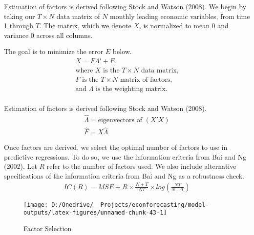 \documentclass[11pt, letterpaper]{article}\usepackage[]{graphicx}\usepackage[]{color}
\begin{document}
Estimation of factors is derived following Stock and Watson (2008). We begin by taking our $T \times N$ data matrix of $N$ monthly leading economic variables, from time 1 through $T$. The matrix, which we denote $X$, is normalized to mean 0 and variance 0 across all columns.

The goal is to minimize the error $E$ below.
\begin{align*}
	X = F  \Lambda ' + E,\\
	\text{where $X$ is the $T \times N$ data matrix,}\\
	\text{$F$ is the $T \times N$ matrix of factors,}\\
	\text{and $\Lambda$ is the weighting matrix.}\\
\end{align*}

Estimation of factors is derived following Stock and Watson (2008).
\begin{align*}
	\widehat{\Lambda} = \text{eigenvectors of } (X'X)\\
	\widehat{F} = X \widehat{\Lambda}
\end{align*}



Once factors are derived, we select the optimal number of factors to use in predictive regressions. To do so, we use the information criteria from Bai and Ng (2002). Let $R$ refer to the number of factors used. We also include alternative specifications of the information criteria from Bai and Ng as a robustness check.
\begin{align*}
	IC(R) = MSE + R \times \frac{N+T}{NT} \times log\left(\frac{NT}{N+T}\right)
\end{align*}

\begin{figure}[H]

{\centering \texttt{[image: D:/Onedrive/\_\_Projects/econforecasting/model-outputs/latex-figures/unnamed-chunk-43-1]} 

}

\caption[Factor Selection]{Factor Selection}\label{fig:unnamed-chunk-43}
\end{figure}
\end{document}
